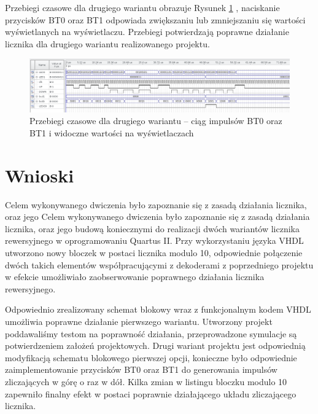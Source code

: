 \documentclass{classrep}
\begin{document}


Przebiegi czasowe dla drugiego wariantu obrazuje Rysunek \ref{fig:symhex4} , naciskanie przycisków BT0 oraz BT1
odpowiada zwiększaniu lub zmniejszaniu się wartości wyświetlanych na wyświetlaczu.
Przebiegi potwierdzają poprawne działanie licznika dla drugiego wariantu realizowanego projektu.

\begin{figure}[H]
	\centering
	\includegraphics[width=1.0\linewidth]{up_down_1_2.png}
	\caption{Przebiegi czasowe dla drugiego wariantu – ciąg impulsów BT0 oraz BT1 i widoczne
	wartości na wyświetlaczach}
	\label{fig:symhex4}
\end{figure}

\section{Wnioski}

Celem wykonywanego dwiczenia było zapoznanie się z zasadą działania licznika, oraz jego Celem wykonywanego dwiczenia było zapoznanie się z zasadą działania licznika, oraz jego budową
koniecznymi do realizacji dwóch wariantów licznika rewersyjnego w oprogramowaniu Quartus II. Przy
wykorzystaniu języka VHDL utworzono nowy bloczek w postaci licznika modulo 10, odpowiednie
połączenie dwóch takich elementów współpracującymi z dekoderami z poprzedniego projektu w
efekcie umożliwiało zaobserwowanie poprawnego działania licznika rewersyjnego. 

Odpowiednio zrealizowany schemat blokowy wraz z funkcjonalnym kodem VHDL umożliwia poprawne działanie
pierwszego wariantu. Utworzony projekt poddawaliśmy testom na poprawność działania,
przeprowadzone symulacje są potwierdzeniem założeń projektowych. Drugi wariant projektu jest
odpowiednią modyfikacją schematu blokowego pierwszej opcji, konieczne było odpowiednie
zaimplementowanie przycisków BT0 oraz BT1 do generowania impulsów zliczających w górę o raz w
dół. Kilka zmian w listingu bloczku modulo 10 zapewniło finalny efekt w postaci poprawnie
działającego układu zliczającego licznika. 
\end{document}
